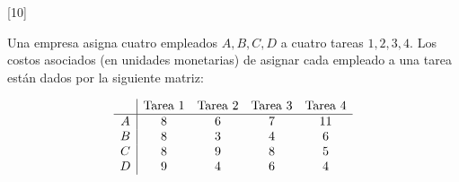 \documentclass[11pt,paper=a4,answers, addpoints]{exam}
\begin{document}
\begin{questions}
[10]

Una empresa asigna cuatro empleados \(A, B, C, D\) a cuatro tareas \(1, 2, 3, 4\). Los costos asociados (en unidades monetarias) de asignar cada empleado a una tarea están dados por la siguiente matriz:

\[
\begin{array}{c|c c c c}
 & \text{Tarea 1} & \text{Tarea 2} & \text{Tarea 3} & \text{Tarea 4} \\
\hline
A & 8 & 6 & 7 & 11 \\
B & 8 & 3 & 4 & 6 \\
C & 8 & 9 & 8 & 5 \\
D & 9 & 4 & 6 & 4
\end{array}
\]


\end{questions}
\end{document}
